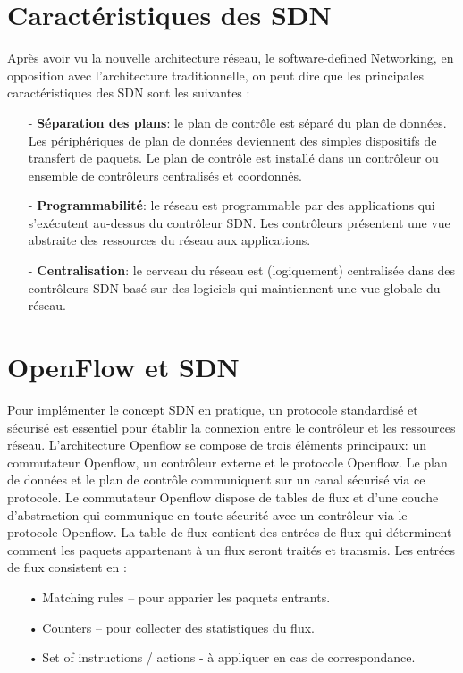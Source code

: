 \section{Caractéristiques des SDN}
Après avoir vu la nouvelle architecture réseau, le software-defined Networking, en opposition avec l'architecture traditionnelle, on peut dire que les principales caractéristiques des SDN sont les suivantes :\\
\begin{itemize}
\item[-]\textbf{Séparation des plans}: le plan de contrôle est séparé du plan de données. Les périphériques de plan de données deviennent des simples dispositifs de transfert de paquets. Le plan de contrôle est installé dans un contrôleur ou ensemble de contrôleurs centralisés et coordonnés.\\
\item[-]\textbf{Programmabilité}: le réseau est programmable par des applications qui s’exécutent au-dessus du contrôleur SDN. Les contrôleurs présentent une vue abstraite des ressources du réseau aux applications.\\
\item[-]\textbf{Centralisation}: le cerveau du réseau est (logiquement) centralisée dans des contrôleurs SDN basé sur des logiciels qui maintiennent une vue globale du réseau.
\end{itemize}

\section{OpenFlow et SDN}
\label{S_OpenFlow}
Pour implémenter le concept SDN en pratique, un protocole standardisé et sécurisé est essentiel  pour établir la connexion entre le contrôleur et les ressources réseau. L’architecture Openflow se compose de trois éléments principaux: un commutateur Openflow, un contrôleur externe et le protocole Openflow. Le plan de données et le plan de contrôle communiquent sur un canal sécurisé via ce protocole. Le commutateur Openflow dispose de tables de flux et d’une couche d’abstraction qui communique en toute sécurité avec un contrôleur via le protocole Openflow. La table de flux contient des entrées de flux qui déterminent comment les paquets appartenant à un flux seront traités et transmis. 
Les entrées de flux consistent en :\\

\begin{itemize}
\item[•] Matching rules – pour apparier les paquets entrants.
\item[•] Counters – pour collecter des statistiques du flux.
\item[•] Set of instructions / actions - à appliquer en cas de correspondance.\\
\end{itemize}

